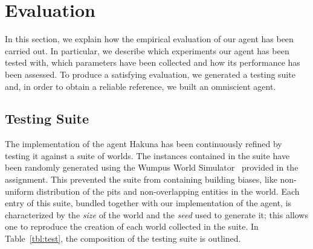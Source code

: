 \documentclass{llncs}
\begin{document}

\section{Evaluation}

In this section, we explain how the empirical evaluation of our agent has been carried out.
In particular, we describe which experiments our agent has been tested with, which parameters have been collected and how its performance has been assessed.
To produce a satisfying evaluation, we generated a testing suite and, in order to obtain a reliable reference, we built an omniscient agent.

\subsection{Testing Suite}

The implementation of the agent Hakuna has been continuously refined by testing it against a suite of worlds.
The instances contained in the suite have been randomly generated using the Wumpus World Simulator~\cite{WWS} provided in the assignment.
This prevented the suite from containing building biases, like non-uniform distribution of the pits and non-overlapping entities in the world.
Each entry of this suite, bundled together with our implementation of the agent, is characterized by the \emph{size} of the world and the \emph{seed} used to generate it; this allows one to reproduce the creation of each world collected in the suite.
In Table~\ref{tbl:test}, the composition of the testing suite is outlined.
\end{document}
